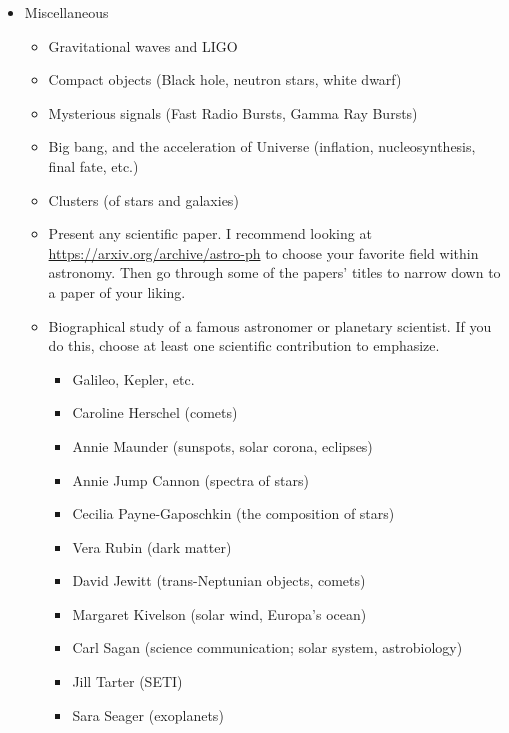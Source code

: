 \documentclass[11pt]{article}
\begin{document}
\begin{itemize}[noitemsep]
    \item Miscellaneous
        \begin{itemize}[noitemsep]
            \item Gravitational waves and LIGO
            \item Compact objects (Black hole, neutron stars, white dwarf)
            \item Mysterious signals (Fast Radio Bursts, Gamma Ray Bursts)
            \item Big bang, and the acceleration of Universe (inflation, nucleosynthesis, final fate, etc.)
            \item Clusters (of stars and galaxies)
            \item Present any scientific paper. I recommend looking at \url{https://arxiv.org/archive/astro-ph} to choose your favorite field within astronomy. Then go through some of the papers' titles to narrow down to a paper of your liking.
            \item Biographical study of a famous astronomer or planetary scientist. If you do this, choose at least one scientific contribution to emphasize.
            \begin{itemize}[noitemsep]
                \item Galileo, Kepler, etc.
                \item Caroline Herschel (comets)
                \item Annie Maunder (sunspots, solar corona, eclipses)
                \item Annie Jump Cannon (spectra of stars)
                \item Cecilia Payne-Gaposchkin (the composition of stars)
                \item Vera Rubin (dark matter)
                \item David Jewitt (trans-Neptunian objects, comets)
                \item Margaret Kivelson (solar wind, Europa’s ocean)
                \item Carl Sagan (science communication; solar system, astrobiology)
                \item Jill Tarter (SETI)
                \item Sara Seager (exoplanets)
            \end{itemize}
            
        \end{itemize}
        
\end{itemize}
\end{document}
